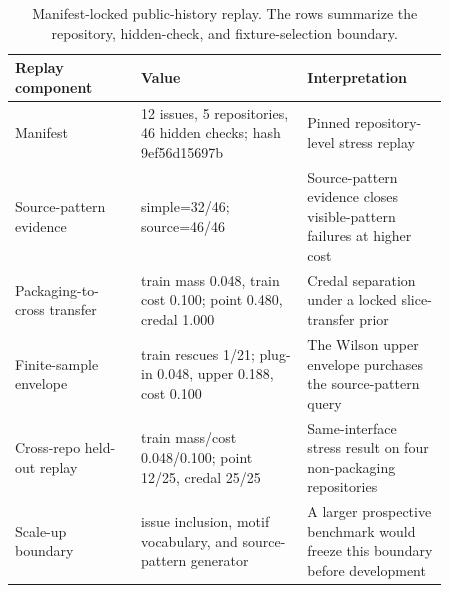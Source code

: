 \begin{table}[H]
\centering
\caption{Manifest-locked public-history replay. The rows summarize the repository, hidden-check, and fixture-selection boundary.}
\label{tab:locked-public-history-replay}
\small
\begin{adjustbox}{width=\linewidth}
\begin{tabular}{@{}L{0.25\linewidth}L{0.33\linewidth}L{0.28\linewidth}@{}}
\toprule
Replay component & Value & Interpretation \\
\midrule
Manifest & 12 issues, 5 repositories, 46 hidden checks; hash 9ef56d15697b & Pinned repository-level stress replay \\
Source-pattern evidence & simple=32/46; source=46/46 & Source-pattern evidence closes visible-pattern failures at higher cost \\
Packaging-to-cross transfer & train mass 0.048, train cost 0.100; point 0.480, credal 1.000 & Credal separation under a locked slice-transfer prior \\
Finite-sample envelope & train rescues 1/21; plug-in 0.048, upper 0.188, cost 0.100 & The Wilson upper envelope purchases the source-pattern query \\
Cross-repo held-out replay & train mass/cost 0.048/0.100; point 12/25, credal 25/25 & Same-interface stress result on four non-packaging repositories \\
Scale-up boundary & issue inclusion, motif vocabulary, and source-pattern generator & A larger prospective benchmark would freeze this boundary before development \\
\bottomrule
\end{tabular}
\end{adjustbox}
\end{table}
